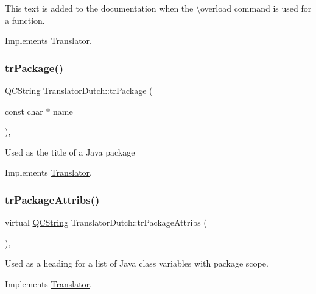 This text is added to the documentation when the \textbackslash{}overload command is used for a function. 

Implements \mbox{\hyperlink{class_translator}{Translator}}.

\mbox{\label{class_translator_dutch_aaec0a1183dccae376b65520e85389ac4}} 
\subsubsection{\texorpdfstring{trPackage()}{trPackage()}}
{\footnotesize\ttfamily \mbox{\hyperlink{class_q_c_string}{Q\+C\+String}} Translator\+Dutch\+::tr\+Package (\begin{DoxyParamCaption}\item[{const char $\ast$}]{name }\end{DoxyParamCaption})\hspace{0.3cm}{\ttfamily [inline]}, {\ttfamily [virtual]}}

Used as the title of a Java package 

Implements \mbox{\hyperlink{class_translator}{Translator}}.

\mbox{\label{class_translator_dutch_a4543f1dd54c990d6977aa26cfc247c8b}} 
\subsubsection{\texorpdfstring{trPackageAttribs()}{trPackageAttribs()}}
{\footnotesize\ttfamily virtual \mbox{\hyperlink{class_q_c_string}{Q\+C\+String}} Translator\+Dutch\+::tr\+Package\+Attribs (\begin{DoxyParamCaption}{ }\end{DoxyParamCaption})\hspace{0.3cm}{\ttfamily [inline]}, {\ttfamily [virtual]}}

Used as a heading for a list of Java class variables with package scope. 

Implements \mbox{\hyperlink{class_translator}{Translator}}.

\mbox{\label{class_translator_dutch_a2c00c3631db34456fedcb30e0155868e}} 
